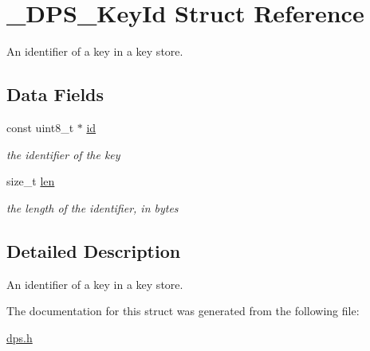 \hypertarget{struct___d_p_s___key_id}{}\section{\+\_\+\+D\+P\+S\+\_\+\+Key\+Id Struct Reference}
\label{struct___d_p_s___key_id}


An identifier of a key in a key store.  


\subsection*{Data Fields}
\begin{DoxyCompactItemize}
\item 
\mbox{\label{struct___d_p_s___key_id_a199ba6a4d89e6eab2b1c7f84db7b0e47}} 
const uint8\+\_\+t $\ast$ \hyperlink{struct___d_p_s___key_id_a199ba6a4d89e6eab2b1c7f84db7b0e47}{id}
\begin{DoxyCompactList}\small\item\em the identifier of the key \end{DoxyCompactList}\item 
\mbox{\label{struct___d_p_s___key_id_ad656ed0567e09b47f95776e8af0f29df}} 
size\+\_\+t \hyperlink{struct___d_p_s___key_id_ad656ed0567e09b47f95776e8af0f29df}{len}
\begin{DoxyCompactList}\small\item\em the length of the identifier, in bytes \end{DoxyCompactList}\end{DoxyCompactItemize}


\subsection{Detailed Description}
An identifier of a key in a key store. 

The documentation for this struct was generated from the following file\+:\begin{DoxyCompactItemize}
\item 
\hyperlink{dps_8h}{dps.\+h}\end{DoxyCompactItemize}
